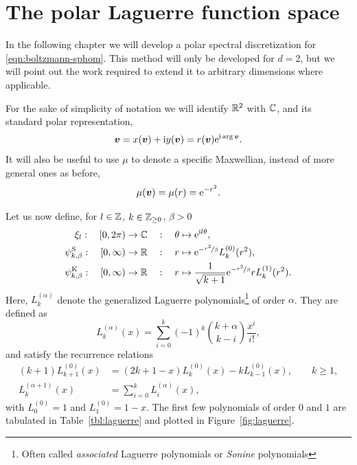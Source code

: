 \section{The polar Laguerre function space} \label{sec:polar}

In the following chapter we will develop a polar spectral discretization for \eqref{eqn:boltzmann-sphom}. This
method will only be developed for $d=2$, but we will point out the work required to extend it to arbitrary
dimensions where applicable.

For the sake of simplicity of notation we will identify $\mathbb{R}^2$ with $\mathbb{C}$, and its standard polar
representation,
\[
    {\bm v} = x({\bm v}) + \mathrm{i} y({\bm v}) = r({\bm v}) \mathrm{e}^{\mathrm{i}\arg{\bm v}}.
\]
It will also be useful to use $\mu$ to denote a specific Maxwellian, instead of more general ones as before,
\begin{equation} \label{eqn:norm-max}
    \mu({\bm v}) = \mu(r) = \mathrm{e}^{-r^2}.
\end{equation}

Let us now define, for $l\in\mathbb{Z}$, $k\in\mathbb{Z}_{\geq0}$, $\beta>0$
\begin{align}
    \xi_l : \quad [0,2\pi) \to \mathbb{C} \quad &: \quad \theta \mapsto \mathrm{e}^{\mathrm{i} l \theta}, \label{eqn:def-ce} \\
    \psi_{k,\beta}^{\mathrm{S}} : \quad [0,\infty) \to \mathbb{R} \quad &: 
        \quad r \mapsto \mathrm{e}^{-\nicefrac{r^2}{\beta}} L_k^{(0)}(r^2), 
    \label{eqn:def-psis} \\
    \psi_{k,\beta}^{\mathrm{K}} : \quad [0,\infty) \to \mathbb{R} \quad &: \quad r \mapsto \frac{1}{\sqrt{k+1}}
                                                 \mathrm{e}^{-\nicefrac{r^2}{\beta}} r L_k^{(1)}(r^2).
    \label{eqn:def-psik}
\end{align}
Here, $L_k^{(\alpha)}$ denote the generalized Laguerre polynomials\footnote{Often called {\em associated}
Laguerre polynomials or {\em Sonine} polynomials} of order $\alpha$. They are defined as
\begin{equation} \label{eqn:def-lag}
    L_k^{(\alpha)}(x) = \sum_{i=0}^k (-1)^k \binom{k+\alpha}{k-i} \frac{x^i}{i!},
\end{equation}
and satisfy the recurrence relations
\begin{align} 
    \label{eqn:lag0-rec} (k+1)L^{(0)}_{k+1}(x) &= (2k+1-x)L_k^{(0)}(x) - kL_{k-1}^{(0)}(x), \qquad k \geq 1, \\
    \label{eqn:lag1-rec} L_k^{(\alpha+1)}(x) &= \sum_{i=0}^k L_i^{(\alpha)}(x),
\end{align}
with $L_0^{(0)} = 1$ and $L_1^{(0)} = 1-x$. The first few polynomials of order $0$ and $1$ are tabulated in
Table~\ref{tbl:laguerre} and plotted in Figure~\ref{fig:laguerre}.

